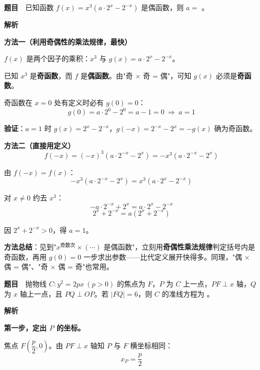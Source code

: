 \par\medskip



\textbf{题目}　已知函数 $f(x)=x^{3}\left(a\cdot2^{x}-2^{-x}\right)$ 是偶函数，则 $a=$ \gkblank{}。

\textbf{解析}

\textbf{方法一（利用奇偶性的乘法规律，最快）}

$f(x)$ 是两个因子的乘积：$x^{3}$ 与 $g(x)=a\cdot2^{x}-2^{-x}$。

已知 $x^{3}$ 是\textbf{奇函数}，而 $f$ 是\textbf{偶函数}。由"奇 × 奇 = 偶"，可知 $g(x)$ 必须是\textbf{奇函数}。

奇函数在 $x=0$ 处有定义时必有 $g(0)=0$：
\[g(0)=a\cdot2^{0}-2^{0}=a-1=0\ \Longrightarrow\ a=1\]

\textbf{验证}：$a=1$ 时 $g(x)=2^{x}-2^{-x}$，$g(-x)=2^{-x}-2^{x}=-g(x)$  确为奇函数。

\textbf{方法二（直接用定义）}
\[f(-x)=(-x)^{3}\left(a\cdot2^{-x}-2^{x}\right)=-x^{3}\left(a\cdot2^{-x}-2^{x}\right)\]

由 $f(-x)=f(x)$：
\[-x^{3}\left(a\cdot2^{-x}-2^{x}\right)=x^{3}\left(a\cdot2^{x}-2^{-x}\right)\]

对 $x\ne0$ 约去 $x^{3}$：
\[-a\cdot2^{-x}+2^{x}=a\cdot2^{x}-2^{-x}\]
\[2^{x}+2^{-x}=a\left(2^{x}+2^{-x}\right)\]

因 $2^{x}+2^{-x}>0$，得 $a=1$。


\begin{gktip}
\textbf{方法总结}：见到"$x^{\text{奇数次}}\times(\cdots)$ 是偶函数"，立刻用\textbf{奇偶性乘法规律}判定括号内是奇函数，再用 $g(0)=0$ 一步求出参数——比代定义展开快得多。同理，"偶 × 偶 = 偶"、"奇 × 偶 = 奇"也常用。
\end{gktip}

\par\medskip


\textbf{题目}　抛物线 $C:y^{2}=2px\ (p>0)$ 的焦点为 $F$，$P$ 为 $C$ 上一点，$PF\perp x$ 轴，$Q$ 为 $x$ 轴上一点，且 $PQ\perp OP$。若 $|FQ|=6$，则 $C$ 的准线方程为 \gkblank{}。

\textbf{解析}

\textbf{第一步，定出 $P$ 的坐标。}

焦点 $F\left(\dfrac p2,0\right)$。由 $PF\perp x$ 轴知 $P$ 与 $F$ 横坐标相同：
\[x_P=\frac p2\]

